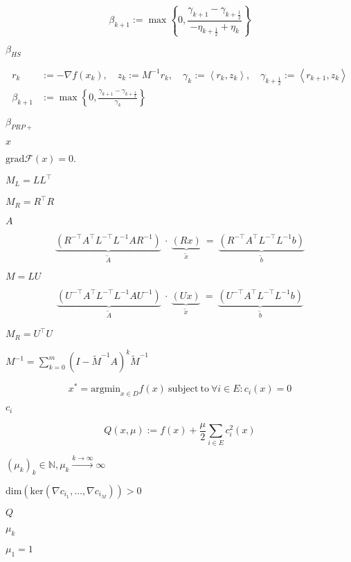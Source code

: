 \documentclass{article}
\begin{document}
\[
  \beta_{k+1} := \max \left\{0, \frac{\gamma_{k+1} - \gamma_{k+\frac{1}{2}}}{ - \eta_{k+\frac{1}{2}}
  + \eta_k} \right\}
\]
\pagebreak

$ \beta_{HS}$
\pagebreak

\begin{align*}
  r_k & := -\nabla f(x_k), \quad z_k := M^{-1} r_k, \quad  \gamma_k := \left< r_k, z_k \right>, \quad
  \gamma_{k+\frac{1}{2}} := \left<r_{k+1}, z_k \right> \\
  \beta_{k+1} & := \max\left\{ 0,  \frac{\gamma_{k+1} - \gamma_{k+\frac{1}{2}}}{\gamma_k} \right\}
\end{align*}
\pagebreak

$ \beta_{PRP+}$
\pagebreak

$x $
\pagebreak

$ \mathrm{grad} \mathcal{F}(x) = 0.$
\pagebreak

$M_L = LL^\top$
\pagebreak

$M_R = R^\top R$
\pagebreak

$A$
\pagebreak

\[ \underbrace{(R^{-\top}A^\top L^{-\top} L^{-1}AR^{-1})}_{\widetilde{A}}
~\cdot~\underbrace{(R x)}_{\widetilde{x}}~=~
\underbrace{(R^{-\top}A^\top L^{-\top} L^{-1} b)}_{\widetilde{b}}\]
\pagebreak

$M = LU$
\pagebreak

\[ \underbrace{(U^{-\top}A^\top L^{-\top} L^{-1}AU^{-1})}_{\widetilde{A}}
~\cdot~\underbrace{(U x)}_{\widetilde{x}}~=~
\underbrace{(U^{-\top}A^\top L^{-\top} L^{-1} b)}_{\widetilde{b}}\]
\pagebreak

$M_R = U^\top U$
\pagebreak

$M^{-1} = \sum_{k=0}^m (I - \tilde M^{-1}A)^k \tilde M^{-1}$
\pagebreak

\[
  x^* = \mathrm{argmin}_{x \in D} f(x) ~ \mathrm{subject~to~} \forall i \in E: c_i(x) = 0
\]
\pagebreak

$ c_i $
\pagebreak

\[
  Q(x,\mu) := f(x) + \frac{\mu}{2} \sum_{i \in E} c_i^2(x)
\]
\pagebreak

$ (\mu_k)_k \in \mathbb{N}, \mu_k \stackrel{k \to \infty}{\longrightarrow} \infty $
\pagebreak

$ \mathrm{dim}( \mathrm{ker} (\nabla c_{i_1}, \dots, \nabla c_{i_M}) ) > 0 $
\pagebreak

$ Q $
\pagebreak

$\mu_k$
\pagebreak

$\mu_1 = 1$
\pagebreak
\end{document}
